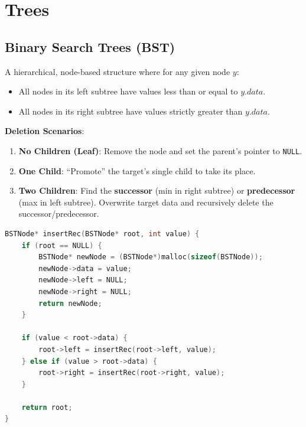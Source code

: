 \chapter{Trees}

\section{Binary Search Trees (BST)}

\begin{definition}
A hierarchical, node-based structure where for any given node $y$:
\begin{itemize}
    \item All nodes in its left subtree have values less than or equal to $y.data$.
    \item All nodes in its right subtree have values strictly greater than $y.data$.
\end{itemize}
\end{definition}

\begin{remark}
\textbf{Deletion Scenarios}:
\begin{enumerate}
    \item \textbf{No Children (Leaf)}: Remove the node and set the parent's pointer to \texttt{NULL}.
    \item \textbf{One Child}: ``Promote'' the target's single child to take its place.
    \item \textbf{Two Children}: Find the \textbf{successor} (min in right subtree) or \textbf{predecessor} (max in left subtree). Overwrite target data and recursively delete the successor/predecessor.
\end{enumerate}
\end{remark}

\begin{lstlisting}[language=C, caption={Recursive BST Insertion}]
BSTNode* insertRec(BSTNode* root, int value) {
    if (root == NULL) {
        BSTNode* newNode = (BSTNode*)malloc(sizeof(BSTNode));
        newNode->data = value;
        newNode->left = NULL;
        newNode->right = NULL;
        return newNode;
    }
    
    if (value < root->data) {
        root->left = insertRec(root->left, value);
    } else if (value > root->data) {
        root->right = insertRec(root->right, value);
    }
    
    return root;
}
\end{lstlisting}

